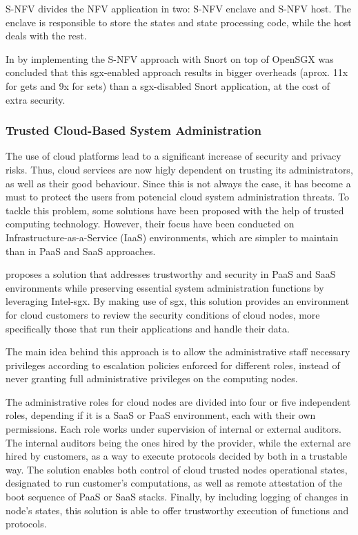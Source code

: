 S-NFV divides the NFV application in two: S-NFV enclave and S-NFV host. The enclave is responsible to store the states and state processing code, while the host deals with the rest.

In \cite{sNFVPaper} by implementing the S-NFV approach with Snort \cite{snortPaper} on top of OpenSGX was
concluded that this \gls{sgx}-enabled approach results in bigger overheads (aprox. 11x for
gets and 9x for sets) than a \gls{sgx}-disabled Snort application, at the cost of extra security.


\subsubsection{Trusted Cloud-Based System Administration}
The use of cloud platforms lead to a significant increase of security and privacy risks. Thus, cloud services are now higly dependent on trusting its administrators, as well as their good behaviour. Since this is not always the case, it has become a must to protect the users from potencial cloud system administration threats. 
To tackle this problem, some solutions have been proposed with the help of trusted computing technology. However, their focus have been conducted on Infrastructure-as-a-Service (IaaS) environments, which are simpler to maintain than in PaaS and SaaS approaches.

\cite{sgxCloudThesis} proposes a solution that addresses trustworthy and security in PaaS and SaaS environments while preserving essential system administration functions by leveraging Intel-\gls{sgx}. By making use of \gls{sgx}, this solution provides an environment for cloud customers to review the security conditions of cloud nodes, more specifically those that run their applications and handle their data.

The main idea behind this approach is to allow the administrative staff necessary privileges according to escalation policies enforced for different roles, instead of never granting full administrative privileges on the computing nodes.

The administrative roles for cloud nodes are divided into four or five independent roles, depending if it is a SaaS or PaaS environment, each with their own permissions. Each role works under supervision of internal or external auditors. The internal auditors being the ones hired by the provider, while the external are hired by customers, as a way to execute protocols decided by both in a trustable way. The solution enables both control of cloud trusted nodes operational states, designated to run customer's computations, as well as remote attestation of the boot sequence of PaaS or SaaS stacks. Finally, by including logging of changes in node's states, this solution is able to offer trustworthy execution of functions and protocols.

